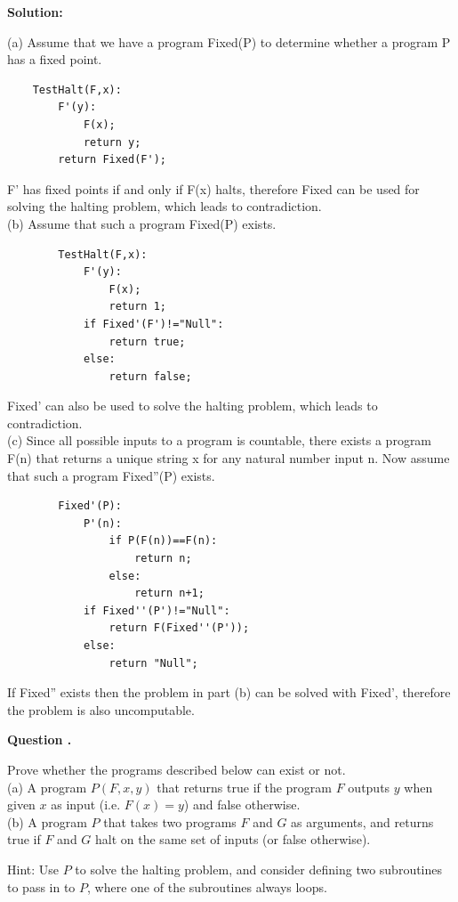 \documentclass[12pt]{article}
\newcounter{questionnumber}
\newenvironment{question}[1][]{\stepcounter{questionnumber}\par\noindent\textbf{Question \thequestionnumber. #1}\par}{\par}
\newenvironment{solution}{\par\noindent\textbf{Solution:}\par}{\par\vspace{1em}}
\begin{document}
\begin{solution}
    \noindent
    (a) Assume that we have a program Fixed(P) to determine whether a program P has a fixed point.
    \begin{lstlisting}
    TestHalt(F,x):
        F'(y):
            F(x);
            return y;
        return Fixed(F');
    \end{lstlisting}
    F' has fixed points if and only if F(x) halts, therefore Fixed can be used for solving the halting problem, which leads to contradiction.\\
    (b) Assume that such a program Fixed(P) exists.
    \begin{lstlisting}
        TestHalt(F,x):
            F'(y):
                F(x);
                return 1;
            if Fixed'(F')!="Null":
                return true;
            else:
                return false;
    \end{lstlisting}
    Fixed' can also be used to solve the halting problem, which leads to contradiction.\\
    (c) Since all possible inputs to a program is countable, there exists a program F(n) that returns a unique string x for any natural number input n.
    Now assume that such a program Fixed''(P) exists.
    \begin{lstlisting}
        Fixed'(P):
            P'(n):
                if P(F(n))==F(n):
                    return n;
                else:
                    return n+1;
            if Fixed''(P')!="Null":
                return F(Fixed''(P'));
            else:
                return "Null";
    \end{lstlisting}
    If Fixed'' exists then the problem in part (b) can be solved with Fixed', therefore the problem is also uncomputable.
\end{solution}
\begin{question}
    Prove whether the programs described below can exist or not.\\
    (a) A program $P(F,x,y)$ that returns true if the program $F$ outputs $y$ when given $x$ as input (i.e. $F(x)=y$) and false otherwise.\\
    (b) A program $P$ that takes two programs $F$ and $G$ as arguments, and returns true if $F$ and $G$ halt on the same set of inputs (or false otherwise).

    Hint: Use $P$ to solve the halting problem, and consider defining two subroutines to pass in to $P$, where one of the subroutines always loops.
\end{question}
\end{document}

